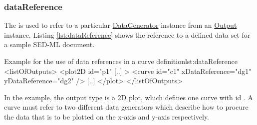 \subsubsection{dataReference}
\label{sec:dataReference}
The  is used to refer to a particular \hyperref[class:dataGenerator]{DataGenerator} instance from an \hyperref[class:output]{Output} instance. 
Listing \ref{lst:dataReference} shows the reference to a defined data set for a sample SED-ML document. 
%
\begin{myXmlLst}{Example for the use of data references in a curve definition}{lst:dataReference}
<listOfOutputs>
  <plot2D id="p1" [..] >
    <curve id="c1" xDataReference="dg1" yDataReference="dg2" />
    [..]
  </plot>
</listOfOutputs>
\end{myXmlLst}
%
In the example, the output type is a 2D plot, which defines one curve with id . A curve must refer to two different data generators which describe how to procure the data that is to be plotted on the x-axis and y-axis respectively. 
